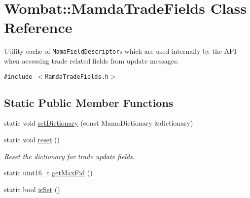 \hypertarget{classWombat_1_1MamdaTradeFields}{
\section{Wombat::Mamda\-Trade\-Fields Class Reference}
\label{classWombat_1_1MamdaTradeFields}
}
Utility cache of {\tt Mama\-Field\-Descriptor}s which are used internally by the API when accessing trade related fields from update messages.  


{\tt \#include $<$Mamda\-Trade\-Fields.h$>$}

\subsection*{Static Public Member Functions}
\begin{CompactItemize}
\item 
static void \hyperlink{classWombat_1_1MamdaTradeFields_24f9db0ce37349e5a86bcd18f9c93d27}{set\-Dictionary} (const Mama\-Dictionary \&dictionary)
\item 
static void \hyperlink{classWombat_1_1MamdaTradeFields_32e1cb689e126579d6298cbd91fe44fd}{reset} ()
\begin{CompactList}\small\item\em Reset the dictionary for trade update fields. \item\end{CompactList}\item 
static uint16\_\-t \hyperlink{classWombat_1_1MamdaTradeFields_7eeedbd0f1b765a307258dc799177881}{get\-Max\-Fid} ()
\item 
static bool \hyperlink{classWombat_1_1MamdaTradeFields_185ffef6d974050df73f337f52ac4f68}{is\-Set} ()
\end{CompactItemize}
